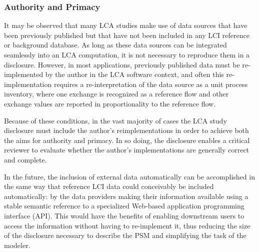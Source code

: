 \subsubsection{Authority and Primacy}

It may be observed that many LCA studies make use of data sources that have been previously published but that have not been included in any LCI reference or background database.  As long as these data sources can be integrated seamlessly into an LCA computation, it is not necessary to reproduce them in a disclosure.  However, in most applications, previously published data must be re-implemented by the author in the LCA software context, and often this re-implementation requires a re-interpretation of the data source as a unit process inventory, where one exchange is recognized as a reference flow and other exchange values are reported in proportionality to the reference flow.

Because of these conditions, in the vast majority of cases the LCA study disclosure must include the author's reimplementations in order to achieve both the aims for authority and primacy.  In so doing, the disclosure enables a critical reviewer to evaluate whether the author's implementations are generally correct and complete.

In the future, the inclusion of external data automatically can be accomplished in the same way that reference LCI data could conceivably be included automatically: by the data providers making their information available  using a stable semantic reference to a specialized Web-based application programming interface (API).  This would have the benefits of enabling downstream users to access the information without having to re-implement it, thus reducing the size of the disclosure necessary to describe the PSM and simplifying the task of the modeler.
